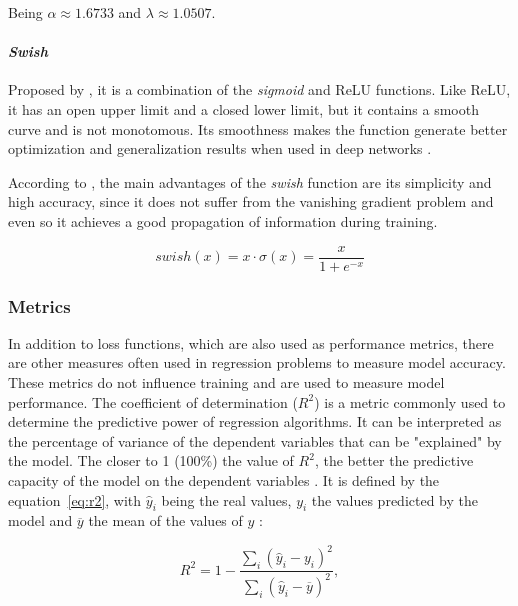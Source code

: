 \documentclass[a4paper,fleqn]{cas-sc}
\begin{document}
Being $\alpha \approx 1.6733$ and $\lambda \approx 1.0507$.

\paragraph{\textit{Swish}}
Proposed by , it is a combination of the \textit{sigmoid} and ReLU functions. Like ReLU, it has an open upper limit and a closed lower limit, but it contains a smooth curve and is not monotomous. Its smoothness makes the function generate better optimization and generalization results when used in deep networks \cite{ramachandran2017searching, nwankpa2018activation}.

According to , the main advantages of the \textit{swish} function are its simplicity and high accuracy, since it does not suffer from the vanishing gradient problem and even so it achieves a good propagation of information during training.

\begin{equation}
\label{eq:swish}
swish(x) = x \cdot \sigma(x) = \frac{x}{1 + e^{-x}}
\end{equation}

\subsubsection{Metrics}
In addition to loss functions, which are also used as performance metrics, there are other measures often used in regression problems to measure model accuracy. These metrics do not influence training and are used to measure model performance. The coefficient of determination ($R^2$) is a metric commonly used to determine the predictive power of regression algorithms. It can be interpreted as the percentage of variance of the dependent variables that can be "explained" by the model. The closer to 1 (100\%) the value of $R^2$, the better the predictive capacity of the model on the dependent variables \cite{Erofeev2019, Nagelkerke1991YEAR}. It is defined by the equation~\ref{eq:r2}, with $\hat{y}_i$ being the real values, $y_i$ the values predicted by the model and $\overline{y}$ the mean of the values of $y$ :

\begin{equation}
\label{eq:r2}
R^2 = 1 - \frac{\sum_{i}(\hat{y}_i - {y}_i)^2}{\sum_{i}(\hat{y}_i - \overline{y})^2},
\end{equation}
\end{document}
